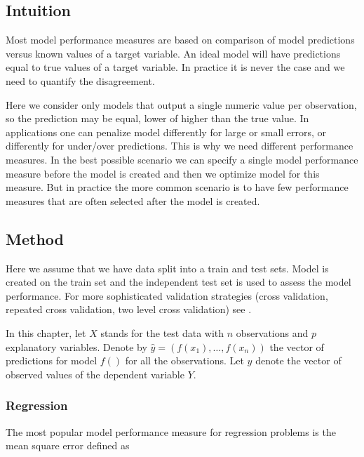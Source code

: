 \documentclass[12pt,]{krantz}
\begin{document}
\hypertarget{modelPerformanceIntuition}{%
\subsection{Intuition}\label{modelPerformanceIntuition}}

Most model performance measures are based on comparison of model predictions versus known values of a target variable. An ideal model will have predictions equal to true values of a target variable. In practice it is never the case and we need to quantify the disagreement.

Here we consider only models that output a single numeric value per observation, so the prediction may be equal, lower of higher than the true value. In applications one can penalize model differently for large or small errors, or differently for under/over predictions. This is why we need different performance measures.
In the best possible scenario we can specify a single model performance measure before the model is created and then we optimize model for this measure. But in practice the more common scenario is to have few performance measures that are often selected after the model is created.

\hypertarget{modelPerformanceMethod}{%
\subsection{Method}\label{modelPerformanceMethod}}

Here we assume that we have data split into a train and test sets. Model is created on the train set and the independent test set is used to assess the model performance. For more sophisticated validation strategies (cross validation, repeated cross validation, two level cross validation) see \citep{AppliedPredictiveModeling2013}.

In this chapter, let \(X\) stands for the test data with \(n\) observations and \(p\) explanatory variables. Denote by \(\widehat{y}=(f(x_1),\ldots,f(x_n))\) the vector of predictions for model \(f()\) for all the observations. Let \(y\) denote the vector of observed values of the dependent variable \(Y\).

\hypertarget{regression}{%
\subsubsection{Regression}\label{regression}}

The most popular model performance measure for regression problems is the mean square error defined as
\end{document}
